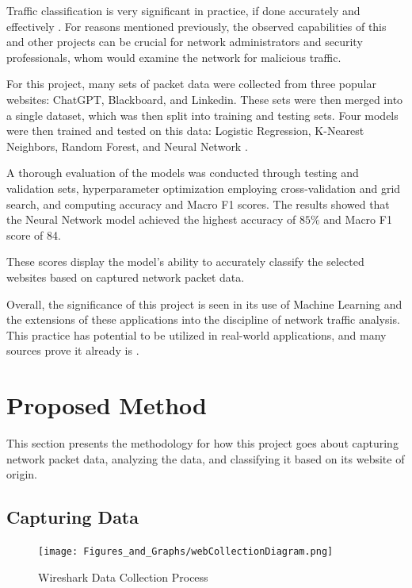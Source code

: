 \documentclass[10pt,sigconf,letterpaper,nonacm]{acmart}
\begin{document}
  Traffic classification is very significant in practice, if done accurately and effectively \cite{10.1109/TNET.2014.2320577}. For reasons mentioned previously, the observed capabilities of this and other projects 
  can be crucial for network administrators and security professionals, whom would examine the network for malicious traffic.

  For this project, many sets of packet data were collected from three popular websites: ChatGPT, Blackboard, and Linkedin. These sets were then merged into a single dataset, which was then split into training and testing sets. 
  Four models were then trained and tested on this data: Logistic Regression, K-Nearest Neighbors, Random Forest, and Neural Network \cite{scikit-learn}. 

  A thorough evaluation of the models was conducted through testing and validation sets, hyperparameter optimization employing cross-validation and grid search, and computing accuracy and Macro F1 scores. The results showed that the Neural Network model 
  achieved the highest accuracy of $85\%$ and Macro F1 score of 84.

  These scores display the model's ability to accurately classify the selected websites based on captured network packet data.

  Overall, the significance of this project is seen in its use of Machine Learning and the extensions of these applications into the discipline of network traffic analysis. This practice has potential to be utilized in real-world applications, and many sources
  prove it already is \cite{10.5555/3432601.3432608}. 

\section{Proposed Method}
This section presents the methodology for how this project goes about capturing network packet data, analyzing the data, and classifying it based on its website of origin.

\subsection{Capturing Data}

\begin{figure}[t]
  \centering
  \texttt{[image: Figures\_and\_Graphs/webCollectionDiagram.png]}
  \caption{Wireshark Data Collection Process}
  \label{fig:dataCollection}
\end{figure}
\end{document}

